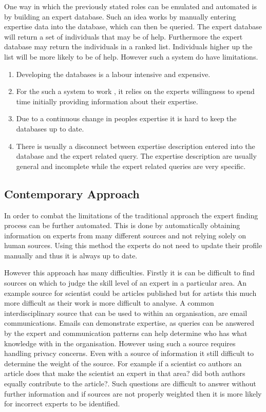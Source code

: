 \documentclass[a4paper,oneside,11pt]{report}
\begin{document}
One way in which the previously stated roles can be emulated and automated is by building an expert database. Such an idea works by manually entering expertise data into the database, which can then be queried. The expert database will return a set of individuals that may be of help. Furthermore the expert database may return the individuals in a ranked list. Individuals higher up the list will be more likely to be of help. However such a system do have limitations\autocite{kobsaseid2003}.
\begin{enumerate}
	\item Developing the databases is a labour intensive and expensive.
	\item For the such a system to work , it relies on the experts willingness to spend time 		  			  initially providing information about their expertise.
	\item Due to a continuous change in peoples expertise it is hard to keep the databases up to 				  date.
	\item There is usually a disconnect between expertise description entered into the database and 	          the expert related query. The expertise description are usually general and incomplete                                                                            		  while the expert related queries are very specific. 
\end{enumerate}

\subsection{Contemporary Approach}
In order to combat the limitations of the traditional approach the expert finding process can be further automated. This is done by automatically obtaining information on experts from many different sources and not relying solely on human sources\autocite{kobsaseid2003}. Using this method the experts do not need to update their profile manually and thus it is always up to date. 

However this approach has many difficulties. Firstly it is can be difficult to find sources on which to judge the skill level of an expert in a particular area. An example source for scientist could be articles published but for artists this much more difficult as their work is more difficult to analyse. A common interdisciplinary source that can be used to within an organisation, are email communications. Emails can demonstrate expertise, as queries can be answered by the expert and communication patterns can help determine who has what knowledge with in the organisation\autocite{campbell2003}. However using such a source requires handling privacy concerns. 
Even with a source of information it still difficult to determine the weight of the source. For example if a scientist co authors an article does that make the scientist an expert in that area? did both authors equally contribute to the article?. Such questions are difficult to answer without further information and if sources are not properly weighted then it is more likely for incorrect experts to be identified.
\end{document}
